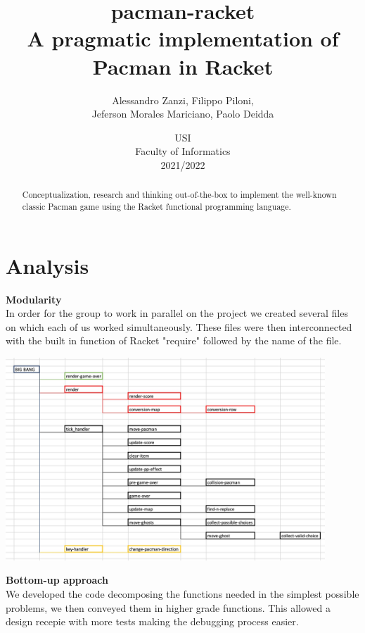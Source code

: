 \documentclass{article}
\title{
\textbf{pacman-racket} \\
A pragmatic implementation of Pacman in Racket
}
\author{
    Alessandro Zanzi,
    Filippo Piloni,\\
    Jeferson Morales Mariciano,
    Paolo Deidda
}
\date{
USI \\
Faculty of Informatics \\
[\baselineskip]  2021/2022
}
\begin{document}
\begin{titlepage}
\maketitle  

\end{titlepage}
 \begin{abstract}
Conceptualization, research and thinking out-of-the-box
to implement the well-known classic Pacman game
using the Racket functional programming language.
 \end{abstract}
\clearpage
 \tableofcontents
 \clearpage
 \section{Analysis}
 
 \hspace{0.5cm}\textbf{Modularity}\\
 In order for the group to work in parallel on the project we created several files on which each of us worked simultaneously. These files were then interconnected with the built in function of Racket "require" followed by the name of the file.
 
 \begin{center}
 \includegraphics[width=12cm]{images/dependency_tree2.jpeg}
 \end{center}
 
 \textbf{Bottom-up approach}\\
 We developed the code decomposing the functions needed in the simplest possible problems, we then conveyed them in higher grade functions. This allowed a design recepie with more tests making the debugging process easier.
 
\end{document}
